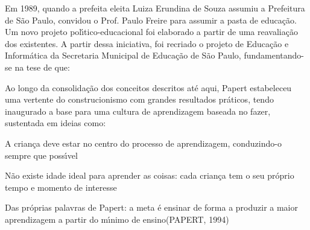 \documentclass[
12pt,		%
openright,	%
twoside,  %
a4paper,			%
chapter=TITLE,		%
english,			%
french,				%
spanish,			%
brazil				%
]{USPSC-classe/USPSC}
\begin{document}
Em 1989, quando a prefeita eleita Luiza Erundina de Souza assumiu a Prefeitura de S\~ao Paulo, convidou o Prof. Paulo Freire para assumir a pasta de educa\c{c}\~ao. Um novo projeto pol\'{\i}tico-educacional foi elaborado a partir de uma reavalia\c{c}\~ao dos existentes. A partir dessa iniciativa, foi recriado o projeto de Educa\c{c}\~ao e Inform\'atica da Secretaria Municipal de Educa\c{c}\~ao de S\~ao Paulo, fundamentando-se na tese de que:










\noindent\begin{center}\mbox{\centering{}}\end{center}


Ao longo da consolida\c{c}\~ao dos conceitos descritos at\'e aqui, Papert estabeleceu uma vertente do construcionismo com grandes resultados pr\'aticos, tendo inaugurado a base para uma cultura de aprendizagem baseada no \textquotedbl fazer\textquotedbl , sustentada em ideias como:










\begin{alineas}
\item A crian\c{c}a deve estar no centro do processo de aprendizagem, conduzindo-o sempre que poss\'{\i}vel
\item N\~ao existe idade ideal para aprender as coisas: cada crian\c{c}a tem o seu pr\'oprio tempo e momento de interesse
\item Das pr\'oprias palavras de Papert: \textquotedbl a meta \'e ensinar de forma a produzir a maior aprendizagem a partir do m\'{\i}nimo de ensino\textquotedbl   (PAPERT, 1994)
\end{alineas}
\end{document}

